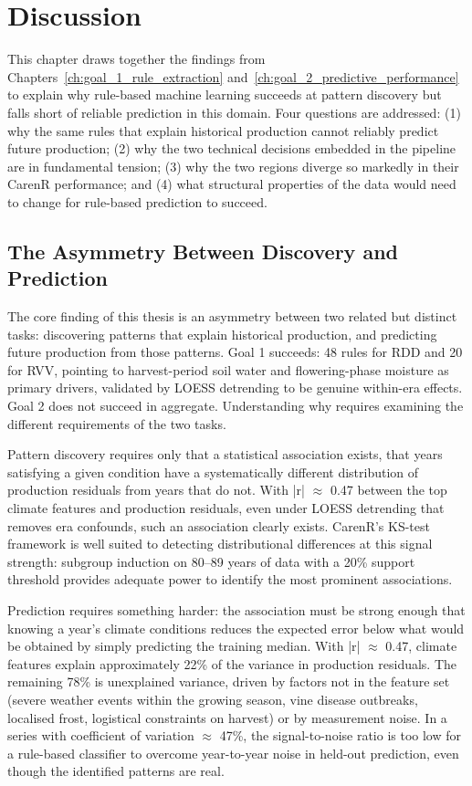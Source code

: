 
\chapter{Discussion}\label{ch:discussion}

This chapter draws together the findings from Chapters~\ref{ch:goal_1_rule_extraction} and~\ref{ch:goal_2_predictive_performance} to explain why rule-based machine learning succeeds at pattern discovery but falls short of reliable prediction in this domain. Four questions are addressed: (1) why the same rules that explain historical production cannot reliably predict future production; (2) why the two technical decisions embedded in the pipeline are in fundamental tension; (3) why the two regions diverge so markedly in their CarenR performance; and (4) what structural properties of the data would need to change for rule-based prediction to succeed.


\section{The Asymmetry Between Discovery and Prediction}\label{sec:the_asymmetry_between_discovery}

The core finding of this thesis is an asymmetry between two related but distinct tasks: discovering patterns that explain historical production, and predicting future production from those patterns. Goal 1 succeeds: 48 rules for RDD and 20 for RVV, pointing to harvest-period soil water and flowering-phase moisture as primary drivers, validated by LOESS detrending to be genuine within-era effects. Goal 2 does not succeed in aggregate. Understanding why requires examining the different requirements of the two tasks.

Pattern discovery requires only that a statistical association exists, that years satisfying a given condition have a systematically different distribution of production residuals from years that do not. With |r| $\approx$ 0.47 between the top climate features and production residuals, even under LOESS detrending that removes era confounds, such an association clearly exists. CarenR's KS-test framework is well suited to detecting distributional differences at this signal strength: subgroup induction on 80--89 years of data with a 20\% support threshold provides adequate power to identify the most prominent associations.

Prediction requires something harder: the association must be strong enough that knowing a year's climate conditions reduces the expected error below what would be obtained by simply predicting the training median. With |r| $\approx$ 0.47, climate features explain approximately 22\% of the variance in production residuals. The remaining 78\% is unexplained variance, driven by factors not in the feature set (severe weather events within the growing season, vine disease outbreaks, localised frost, logistical constraints on harvest) or by measurement noise. In a series with coefficient of variation $\approx$ 47\%, the signal-to-noise ratio is too low for a rule-based classifier to overcome year-to-year noise in held-out prediction, even though the identified patterns are real.

